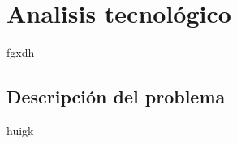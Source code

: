 \chapter{Analisis tecnológico}\label{chap:Analisis}

fgxdh

\section{Descripción del problema}

huigk



